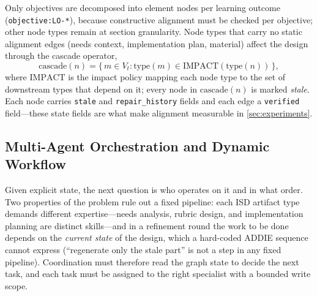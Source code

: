 Only objectives are decomposed into element nodes per learning outcome (\texttt{objective:LO-*}), because constructive alignment must be checked per objective; other node types remain at section granularity. Node types that carry no static alignment edges (needs context, implementation plan, material) affect the design through the cascade operator,
\[
\mathrm{cascade}(n) = \{\, m \in V_t : \mathrm{type}(m) \in \mathrm{IMPACT}(\mathrm{type}(n)) \,\},
\]
where $\mathrm{IMPACT}$ is the impact policy mapping each node type to the set of downstream types that depend on it; every node in $\mathrm{cascade}(n)$ is marked \emph{stale}. Each node carries \texttt{stale} and \texttt{repair\_history} fields and each edge a \texttt{verified} field---these state fields are what make alignment measurable in \cref{sec:experiments}.

\subsection{Multi-Agent Orchestration and Dynamic Workflow}
\label{sec:orchestration}

Given explicit state, the next question is who operates on it and in what order. Two properties of the problem rule out a fixed pipeline: each ISD artifact type demands different expertise---needs analysis, rubric design, and implementation planning are distinct skills---and in a refinement round the work to be done depends on the \emph{current state} of the design, which a hard-coded ADDIE sequence cannot express (``regenerate only the stale part'' is not a step in any fixed pipeline). Coordination must therefore read the graph state to decide the next task, and each task must be assigned to the right specialist with a bounded write scope.

